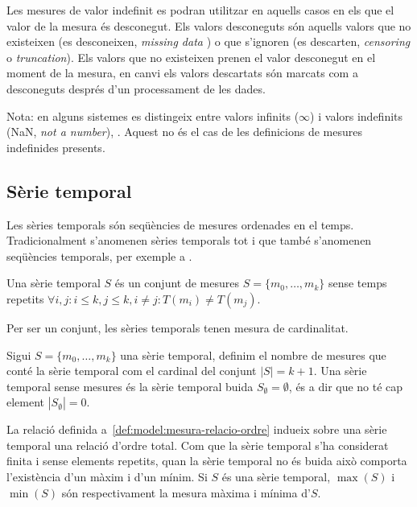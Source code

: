Les mesures de valor indefinit es podran utilitzar en aquells casos en
els que el valor de la mesura és desconegut. Els valors desconeguts
són aquells valors que no existeixen (es desconeixen, \emph{missing
  data} ) o que s'ignoren (es descarten, \emph{censoring} o
\emph{truncation}). Els valors que no existeixen prenen el valor
desconegut en el moment de la mesura, en canvi els valors descartats
són marcats com a desconeguts després d'un processament de les dades.

Nota: en alguns sistemes es distingeix entre valors infinits
($\infty$) i valors indefinits (NaN, \emph{not a number}),
\cite{wiki:ieee754}. Aquest no és el cas de les definicions de mesures
indefinides presents.



\subsection{Sèrie temporal}
\label{sec:model:serietemporal}

Les sèries temporals són seqüències de mesures ordenades en el temps.
Tradicionalment s'anomenen sèries temporals tot i que també s'anomenen
seqüències temporals, per exemple a \cite{last:hetland}.

\begin{definition}
  \label{def:serie_temporal}
  Una sèrie temporal $S$ és un conjunt de mesures
  $S=\{m_0,\ldots,m_k\}$ sense temps repetits
  $\forall i,j: i\leq k, j\leq k, i\neq j : T(m_i)\neq T(m_j)$.
\end{definition}

Per ser un conjunt, les sèries temporals tenen mesura de cardinalitat.
\begin{definition}[Cardinal]
  Sigui $S=\{m_0,\ldots,m_k\}$ una sèrie temporal, definim el nombre
  de mesures que conté la sèrie temporal com el cardinal del conjunt
  $|S|=k+1$. Una sèrie temporal sense mesures és la sèrie temporal
  buida $S_\emptyset= \emptyset$, és a dir que no té cap element
  $|S_\emptyset|=0$.
\end{definition}

La relació definida a~\ref{def:model:mesura-relacio-ordre} indueix
sobre una sèrie temporal una relació d'ordre total. Com que la sèrie
temporal s'ha considerat finita i sense elements repetits, quan la
sèrie temporal no és buida això comporta l'existència d'un màxim i
d'un mínim.  Si $S$ és una sèrie temporal, $\max(S)$ i $\min(S)$ són
respectivament la mesura màxima i mínima d'$S$.

